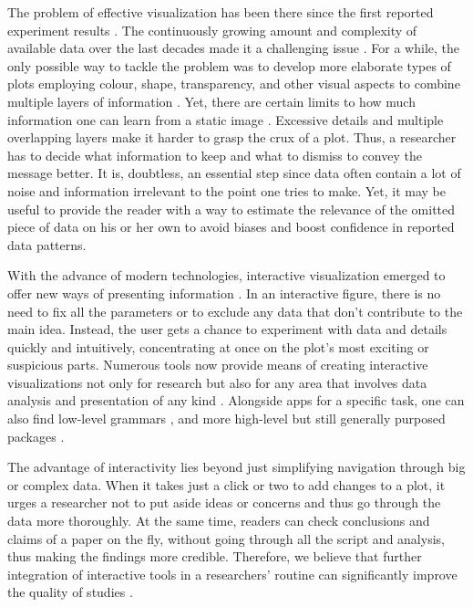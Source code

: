 \documentclass[twocolumn,10pt]{article}
\begin{document}
The problem of effective visualization has been there since the first reported experiment results \citep{friendly_2001}. The continuously growing amount and complexity of available data over the last decades made it a challenging issue \citep{fisher_2017}. For a while, the only possible way to tackle the problem was to develop more elaborate types of plots employing colour, shape, transparency, and other visual aspects to combine multiple layers of information \citep{keahey_2013, bertin_2011, heer_2009}. Yet, there are certain limits to how much information one can learn from a static image \citep{hegarty_2011}. Excessive details and multiple overlapping layers make it harder to grasp the crux of a plot. Thus, a researcher has to decide what information to keep and what to dismiss to convey the message better\citep{odonoghue_2018}. 
It is, doubtless, an essential step since data often contain a lot of noise and information irrelevant to the point one tries to make. Yet, it may be useful to provide the reader with a way to estimate the relevance of the omitted piece of data on his or her own to avoid biases \citep{bresciani_2009} and boost confidence in reported data patterns.

With the advance of modern technologies, interactive visualization emerged to offer new ways of presenting information \citep{newman_1979, becker_1987}. In an interactive figure, there is no need to fix all the parameters or to exclude any data that don't contribute to the main idea. Instead, the user gets a chance to experiment with data and details quickly and intuitively, concentrating at once on the plot's most exciting or suspicious parts. Numerous tools \citep{caldarola_2017} now provide means of creating interactive visualizations not only for research \citep{noronha_2017, wick_2015, hillje_2020, broman_2015} but also for any area that involves data analysis and presentation of any kind \citep{zhao_2012, wu_2010}. Alongside apps for a specific task, one can also find low-level grammars \citep{bostock_2011, satyanarayan_2015}, and more high-level but still generally purposed packages \citep{satyanarayan_2016, shiny, p_2019, sievert_2019, sievert_2020}.

The advantage of interactivity lies beyond just simplifying navigation through big or complex data. When it takes just a click or two to add changes to a plot, it urges a researcher not to put aside ideas or concerns and thus go through the data more thoroughly. At the same time, readers can check conclusions and claims of a paper on the fly, without going through all the script and analysis, thus making the findings more credible. Therefore, we believe that further integration of interactive tools in a researchers' routine can significantly improve the quality of studies \citep{shander_2016, yuk_2014}.
\end{document}
